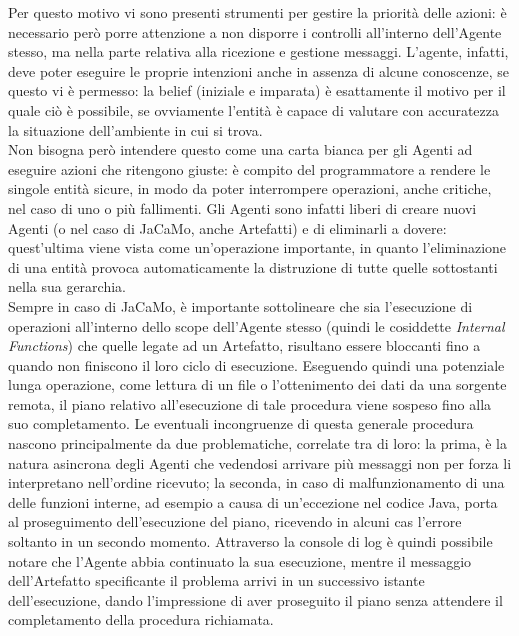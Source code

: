 \documentclass[12pt,a4paper,openright,oneside]{report}
\begin{document}
Per questo motivo vi sono presenti strumenti per gestire la priorità delle azioni: è necessario però porre attenzione a non disporre i controlli all'interno dell'Agente stesso, ma nella parte relativa alla ricezione e gestione messaggi. L'agente, infatti, deve poter eseguire le proprie intenzioni anche in assenza di alcune conoscenze, se questo vi è permesso: la belief (iniziale e imparata) è esattamente il motivo per il quale ciò è possibile, se ovviamente l'entità è capace di valutare con accuratezza la situazione dell'ambiente in cui si trova.\\

Non bisogna però intendere questo come una carta bianca per gli Agenti ad eseguire azioni che ritengono giuste: è compito del programmatore a rendere le singole entità sicure, in modo da poter interrompere operazioni, anche critiche, nel caso di uno o più fallimenti. Gli Agenti sono infatti liberi di creare nuovi Agenti (o nel caso di JaCaMo, anche Artefatti) e di eliminarli a dovere: quest'ultima viene vista come un'operazione importante, in quanto l'eliminazione di una entità provoca automaticamente la distruzione di tutte quelle sottostanti nella sua gerarchia.\\

Sempre in caso di JaCaMo, è importante sottolineare che sia l'esecuzione di operazioni all'interno dello scope dell'Agente stesso (quindi le cosiddette \textit{Internal Functions}) che quelle legate ad un Artefatto, risultano essere bloccanti fino a quando non finiscono il loro ciclo di esecuzione. Eseguendo quindi una potenziale lunga operazione, come lettura di un file o l'ottenimento dei dati da una sorgente remota, il piano relativo all'esecuzione di tale procedura viene sospeso fino alla suo completamento. Le eventuali incongruenze di questa generale procedura nascono principalmente da due problematiche, correlate tra di loro: la prima, è la natura asincrona degli Agenti che vedendosi arrivare più messaggi non per forza li interpretano nell'ordine ricevuto; la seconda, in caso di malfunzionamento di una delle funzioni interne, ad esempio a causa di un'eccezione nel codice Java, porta al proseguimento dell'esecuzione del piano, ricevendo in alcuni cas l'errore soltanto in un secondo momento. Attraverso la console di log è quindi possibile notare che l'Agente abbia continuato la sua esecuzione, mentre il messaggio dell'Artefatto specificante il problema arrivi in un successivo istante dell'esecuzione, dando l'impressione di aver proseguito il piano senza attendere il completamento della procedura richiamata.\\
\end{document}
